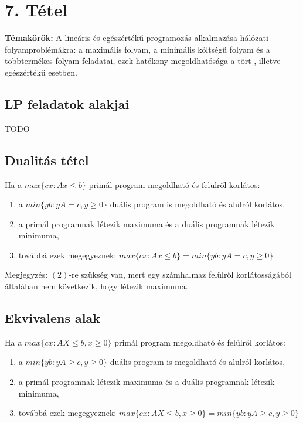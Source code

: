 
\setcounter{chapter}{7}
\chapter*{7. Tétel}

\textbf{Témakörök:} A lineáris és egészértékű programozás alkalmazása hálózati folyamproblémákra: a maximális folyam, a minimális költségű folyam és a többtermékes folyam feladatai, ezek hatékony megoldhatósága a tört-, illetve egészértékű esetben.

\noindent\hrulefill

\section*{LP feladatok alakjai}

\begin{theo} TODO \end{theo}

\section*{Dualitás tétel}

\begin{theo} 
Ha a $max \lbrace c x: Ax\leq b\rbrace$ primál program megoldható és felülről korlátos:
\begin{enumerate}
\item	a $min \lbrace yb: yA=c,y\geq 0\rbrace$ duális program is megoldható és alulról korlátos,
\item	a primál programnak létezik maximuma és a duális programnak létezik minimuma,
\item	továbbá ezek megegyeznek: $max\lbrace cx: Ax\leq b\rbrace = min\lbrace yb: yA=c,y\geq 0\rbrace$
\end{enumerate}
\end{theo}
Megjegyzés: $(2)$-re szükség van, mert egy számhalmaz felülről korlátosságából általában nem következik, hogy létezik maximuma.

\section*{Ekvivalens alak}
\begin{theo}
Ha a $max\lbrace cx:AX\leq b,x\geq 0\rbrace$ primál program megoldható és felülről korlátos:
\begin{enumerate}
\item a $min \lbrace yb:yA\geq c, y \geq 0\rbrace$ duális program is megoldható és alulról korlátos,
\item	a primál programnak létezik maximuma és a duális programnak létezik minimuma,
\item	továbbá ezek megegyeznek: $max\lbrace cx:AX\leq b,x\geq 0\rbrace = min \lbrace yb:yA\geq c, y \geq 0\rbrace$
\end{enumerate}
\end{theo}

